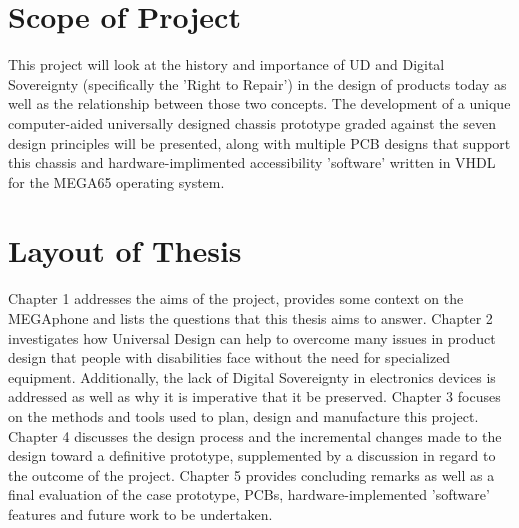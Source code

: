 
\section{Scope of Project}

This project will look at the history and importance of UD and Digital Sovereignty (specifically the 'Right to Repair') in the design of products today as well as the relationship between those two concepts.
The development of a unique computer-aided universally designed chassis prototype graded against the seven design principles\cite{sevenprinciples} will be presented, along with multiple PCB designs that support this chassis and hardware-implimented accessibility 'software' written in VHDL for the MEGA65 operating system.


\section{Layout of Thesis}

Chapter 1 addresses the aims of the project, provides some context on the MEGAphone and lists the questions that this thesis aims to answer.
Chapter 2 investigates how Universal Design can help to overcome many issues in product design that people with disabilities face without the need for specialized equipment. 
Additionally, the lack of Digital Sovereignty in electronics devices is addressed as well as why it is imperative that it be preserved.
Chapter 3 focuses on the methods and tools used to plan, design and manufacture this project.
Chapter 4 discusses the design process and the incremental changes made to the design toward a definitive prototype, supplemented by a discussion in regard to the outcome of the project. 
Chapter 5 provides concluding remarks as well as a final evaluation of the case prototype, PCBs, hardware-implemented 'software' features and future work to be undertaken.




